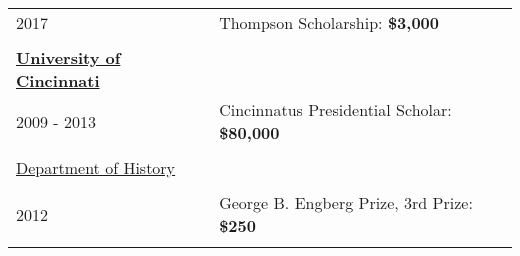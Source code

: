 \documentclass[margin,line,pifont,palatino,courier]{res}
\newenvironment{list1}{
  \begin{list}{\ding{113}}{%
      \setlength{\itemsep}{0in}
      \setlength{\parsep}{0in} \setlength{\parskip}{0in}
      \setlength{\topsep}{0in} \setlength{\partopsep}{0in}
      \setlength{\leftmargin}{0.17in}}}{\end{list}}
\begin{document}
\begin{resume}
\begin{tabular}{ll}
  2017       & Thompson Scholarship: \bf{\$3,000}\\
  \\
  \textbf{\underline{University of Cincinnati}}&\\
  2009 - 2013 & Cincinnatus Presidential Scholar: \bf{\$80,000}\\
  \\
  \underline{Department of History}&\\
  \\
  2012       & George B. Engberg Prize, 3rd Prize: \bf{\$250}  \\
  \\
\end{tabular}










\end{resume}
\end{document}
